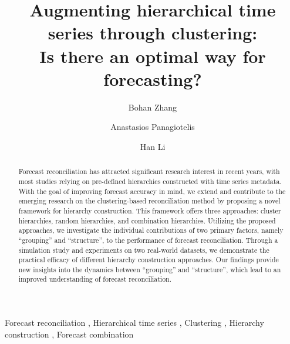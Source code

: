 \documentclass[a4paper,review,12pt,authoryear]{elsarticle}
\begin{document}
\begin{frontmatter}

\title{Augmenting hierarchical time series through clustering: \\Is there an optimal way for forecasting?}



  \author[label1]{Bohan Zhang}
  \address[label1]{School of Economics and Management, Beihang University, Beijing, China}
  \author[label2]{Anastasios Panagiotelis}
  \address[label2]{The University of Sydney Business School, NSW 2006, Australia}
  \author[label3]{Han Li}
  \address[label3]{Department of Economics, The University of Melbourne, VIC 3010, Australia}

  \begin{abstract}

    Forecast reconciliation has attracted significant research interest in recent years, with most studies relying on pre-defined hierarchies constructed with time series metadata. With the goal of improving forecast accuracy in mind, we extend and contribute to the emerging research on the clustering-based reconciliation method by proposing a novel framework for hierarchy construction. This framework offers three approaches: cluster hierarchies, random hierarchies, and combination hierarchies. Utilizing the proposed approaches, we investigate the individual contributions of two primary factors, namely ``grouping'' and ``structure'', to the performance of forecast reconciliation.  Through a simulation study and experiments on two real-world datasets, we demonstrate the practical efficacy of different hierarchy construction approaches. Our findings provide new insights into the dynamics between ``grouping'' and ``structure'', which lead to an improved understanding of forecast reconciliation.\\

  \end{abstract}

  \begin{keyword}
  Forecast reconciliation \sep
  Hierarchical time series \sep
  Clustering \sep
  Hierarchy construction \sep
  Forecast combination
  \end{keyword}

\end{frontmatter}

\newpage
\end{document}
